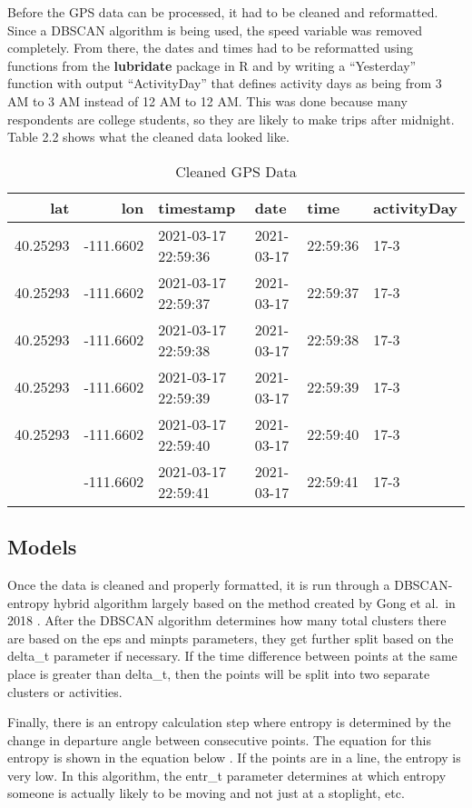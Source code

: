 \documentclass[3p, authoryear]{elsarticle} %
\begin{document}
Before the GPS data can be processed, it had to be cleaned and reformatted. Since a DBSCAN algorithm is being used, the speed variable was removed completely. From there, the dates and times had to be reformatted using functions from the \textbf{lubridate} package in R and by writing a ``Yesterday'' function with output ``ActivityDay'' that defines activity days as being from 3 AM to 3 AM instead of 12 AM to 12 AM. This was done because many respondents are college students, so they are likely to make trips after midnight. Table 2.2 shows what the cleaned data looked like.

\begin{longtable}[t]{rrllll}
\caption{\label{tab:Figure2}Cleaned GPS Data}\\
\toprule
lat & lon & timestamp & date & time & activityDay\\
\midrule
40.25293 & -111.6602 & 2021-03-17 22:59:36 & 2021-03-17 & 22:59:36 & 17-3\\
40.25293 & -111.6602 & 2021-03-17 22:59:37 & 2021-03-17 & 22:59:37 & 17-3\\
40.25293 & -111.6602 & 2021-03-17 22:59:38 & 2021-03-17 & 22:59:38 & 17-3\\
40.25293 & -111.6602 & 2021-03-17 22:59:39 & 2021-03-17 & 22:59:39 & 17-3\\
40.25293 & -111.6602 & 2021-03-17 22:59:40 & 2021-03-17 & 22:59:40 & 17-3\\
\addlinespace
40.25293 & -111.6602 & 2021-03-17 22:59:41 & 2021-03-17 & 22:59:41 & 17-3\\
\bottomrule
\end{longtable}

\hypertarget{models}{%
\subsection{Models}\label{models}}

Once the data is cleaned and properly formatted, it is run through a DBSCAN-entropy hybrid algorithm largely based on the method created by Gong et al.~in 2018 \citep{GongInspiration}. After the DBSCAN algorithm determines how many total clusters there are based on the eps and minpts parameters, they get further split based on the delta\_t parameter if necessary. If the time difference between points at the same place is greater than delta\_t, then the points will be split into two separate clusters or activities.

Finally, there is an entropy calculation step where entropy is determined by the change in departure angle between consecutive points. The equation for this entropy is shown in the equation below \citep{GongInspiration}. If the points are in a line, the entropy is very low. In this algorithm, the entr\_t parameter determines at which entropy someone is actually likely to be moving and not just at a stoplight, etc.
\end{document}

